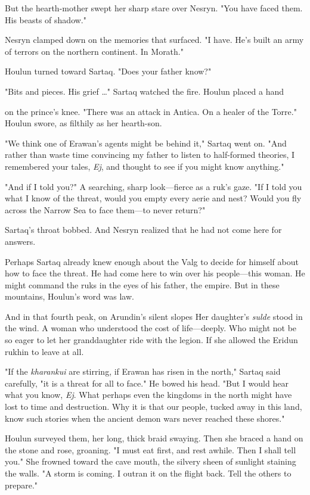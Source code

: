 But the hearth-mother swept her sharp stare over Nesryn. "You have faced them. His beasts of shadow."

Nesryn clamped down on the memories that surfaced. "I have. He's built an army of terrors on the northern continent. In Morath."

Houlun turned toward Sartaq. "Does your father know?"

"Bits and pieces. His grief \ldots" Sartaq watched the fire. Houlun placed a hand

on the prince's knee. "There was an attack in Antica. On a healer of the Torre." Houlun swore, as filthily as her hearth-son.

"We think one of Erawan's agents might be behind it," Sartaq went on. "And rather than waste time convincing my father to listen to half-formed theories, I remembered your tales, \emph{Ej}, and thought to see if you might know anything."

"And if I told you?" A searching, sharp look---fierce as a ruk's gaze. "If I told you what I know of the threat, would you empty every aerie and nest? Would you fly across the Narrow Sea to face them---to never return?"

Sartaq's throat bobbed. And Nesryn realized that he had not come here for answers.

Perhaps Sartaq already knew enough about the Valg to decide for himself about how to face the threat. He had come here to win over his people---this woman. He might command the ruks in the eyes of his father, the empire. But in these mountains, Houlun's word was law.

And in that fourth peak, on Arundin's silent slopes  Her daughter's \emph{sulde} stood in the wind. A woman who understood the cost of life---deeply. Who might not be so eager to let her granddaughter ride with the legion. If she allowed the Eridun rukhin to leave at all.

"If the \emph{kharankui} are stirring, if Erawan has risen in the north," Sartaq said carefully, "it is a threat for all to face." He bowed his head. "But I would hear what you know, \emph{Ej}. What perhaps even the kingdoms in the north might have lost to time and destruction. Why it is that our people, tucked away in this land, know such stories when the ancient demon wars never reached these shores."

Houlun surveyed them, her long, thick braid swaying. Then she braced a hand on the stone and rose, groaning. "I must eat first, and rest awhile. Then I shall tell you." She frowned toward the cave mouth, the silvery sheen of sunlight staining the walls. "A storm is coming. I outran it on the flight back. Tell the others to prepare."

